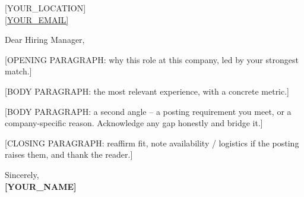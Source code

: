 \documentclass[11pt,a4paper]{article}
\begin{document}
[YOUR_LOCATION]\\
\href{mailto:[YOUR_EMAIL]}{[YOUR_EMAIL]}\\
[DATE]                                  %

\vspace{6pt}

%

Dear Hiring Manager,        %

[OPENING PARAGRAPH: why this role at this company, led by your strongest match.]

[BODY PARAGRAPH: the most relevant experience, with a concrete metric.]

[BODY PARAGRAPH: a second angle -- a posting requirement you meet, or a
company-specific reason. Acknowledge any gap honestly and bridge it.]

[CLOSING PARAGRAPH: reaffirm fit, note availability / logistics if the posting
raises them, and thank the reader.]

\vspace{4pt}

Sincerely,\\[2pt]
{\color{accent}\textbf{[YOUR_NAME]}}
\end{document}

